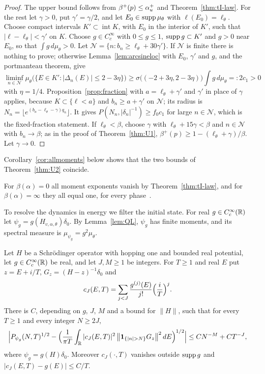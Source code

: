 \begin{proof}
The upper bound follows from $\beta^+(p)\le\alpha_u^+$ and Theorem~\ref{thm:tI-law}. For the rest let $\gamma>0$, put $\gamma'=\gamma/2$, and let $E_0\in\operatorname{supp}\mu_\theta$ with $\ell(E_0)=\ell_\theta$. Choose compact intervals $K'\subset\operatorname{int}K$, with $E_0$ in the interior of $K'$, such that $|\ell-\ell_\theta|<\gamma'$ on $K$. Choose $g\in C_c^\infty$ with $0\le g\le1$, $\operatorname{supp} g\subset K'$ and $g>0$ near $E_0$, so that $\int g\,d\mu_\theta>0$. Let $\mathcal N=\{n:b_n\ge\ell_\theta+30\gamma'\}$. If $\mathcal N$ is finite there is nothing to prove; otherwise Lemma~\ref{lem:arcsineloc} with $E_0$, $\gamma'$ and $g$, and the portmanteau theorem, give
\[
\liminf_{n\in\mathcal N}\mu_\theta\bigl(\{E\in K':|\Delta_n(E)|\le2-3\eta\}\bigr)\ge\sigma\bigl((-2+3\eta,2-3\eta)\bigr)\int g\,d\mu_\theta=:2c_1>0
\]
with $\eta=1/4$. Proposition~\ref{prop:fraction} with $a=\ell_\theta+\gamma'$ and $\gamma'$ in place of $\gamma$ applies, because $K\subset\{\ell<a\}$ and $b_n\ge a+\gamma'$ on $\mathcal N$; its radius is $N_n=\lfloor e^{(b_n-\ell_\theta-\gamma)q_n}\rfloor$. It gives $P(N_n,|\delta_n|^{-1})\ge f_0c_1$ for large $n\in\mathcal N$, which is the fixed-fraction statement. If $\ell_\theta<\beta$, choose $\gamma$ with $\ell_\theta+15\gamma<\beta$ and $n\in\mathcal N$ with $b_n\to\beta$; as in the proof of Theorem~\ref{thm:U1}, $\beta^+(p)\ge1-(\ell_\theta+\gamma)/\beta$. Let $\gamma\to0$.
\end{proof}

Corollary~\ref{cor:allmoments} below shows that the two bounds of Theorem~\ref{thm:U2} coincide.

\begin{remark}\label{rem:U2-shift}
For $\beta(\alpha)=0$ all moment exponents vanish by Theorem~\ref{thm:tI-law}, and for $\beta(\alpha)=\infty$ they all equal one, for every phase~\cite[Theorem~3(2)]{JZ2022}.
\end{remark}

To resolve the dynamics in energy we filter the initial state. For real $g\in C_c^\infty(\mathbb R)$ let $\psi_g=g(H_{v,\alpha,\theta})\delta_0$. By Lemma~\ref{lem:QL}, $\psi_g$ has finite moments, and its spectral measure is $\mu_{\psi_g}=g^2\mu_\theta$.

\begin{lemma}[Filtering]\label{lem:filter}
Let $H$ be a Schr\"odinger operator with hopping one and bounded real potential, let $g\in C_c^\infty(\mathbb R)$ be real, and let $J,M\ge1$ be integers. For $T\ge1$ and real $E$ put $z=E+i/T$, $G_z=(H-z)^{-1}\delta_0$ and
\[
c_J(E,T)=\sum_{j<J}\frac{g^{(j)}(E)}{j!}\Bigl(\frac iT\Bigr)^j .
\]
There is $C$, depending on $g$, $J$, $M$ and a bound for $\|H\|$, such that for every $T\ge1$ and every integer $N\ge2J$,
\[
\Bigl|P_{\psi_g}(N,T)^{1/2}-\Bigl(\frac1{\pi T}\int_\R|c_J(E,T)|^2\,\bigl\|\un_{\{|n|>N\}}G_z\bigr\|^2\,dE\Bigr)^{1/2}\Bigr|\le CN^{-M}+CT^{-J},
\]
where $\psi_g=g(H)\delta_0$. Moreover $c_J(\cdot,T)$ vanishes outside $\operatorname{supp} g$ and $|c_J(E,T)-g(E)|\le C/T$.
\end{lemma}

